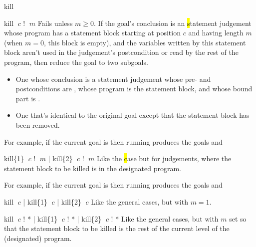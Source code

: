 \begin{tactic}{kill}
  \begin{tsyntax}{kill $\;c$ ! $\;m$}
    Fails unless $m\geq 0$.  If the goal's conclusion is
    an \hl statement judgement whose program has a statement block
    starting at position $c$ and having length $m$ (when $m = 0$, this
    block is empty), and the variables written by this statement block
    aren't used in the judgement's postcondition or read by the rest
    of the program, then reduce the goal to two subgoals.
    \begin{itemize}
    \item One whose conclusion is a \phl statement judgement whose pre-
       and postconditions are , whose program is the
       statement block, and whose bound part is .

    \item One that's identical to the original goal except that the
      statement block has been removed.
    \end{itemize}

    \medskip For example, if the current goal is
     then
    running 
    produces the goals
    and
  \end{tsyntax}

  \begin{tsyntax}{kill\{1\} $\;c$ ! $\;m$ | kill\{2\} $\;c$ ! $\;m$}
    Like the \hl case but for \prhl judgements, where the statement
    block to be killed is in the designated program.

    \medskip For example, if the current goal is
     then
    running 
    produces the goals
    and
  \end{tsyntax}

  \begin{tsyntax}{kill $\;c$ | kill\{1\} $\;c$ | kill\{2\} $\;c$}
    Like the general cases, but with $m = 1$.
  \end{tsyntax}

  \begin{tsyntax}{kill $\;c$ ! * | kill\{1\} $\;c$ ! * | kill\{2\} $\;c$ ! *}
    Like the general cases, but with $m$ set so that the statement
    block to be killed is the rest of the current level of the
    (designated) program.
  \end{tsyntax}
\end{tactic}
